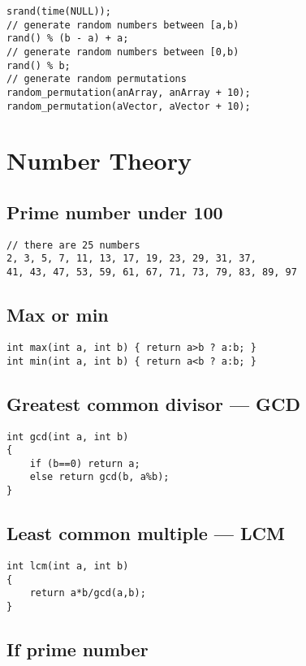 \documentclass[a4paper]{article}
\begin{document}
\begin{verbatim}
srand(time(NULL));
// generate random numbers between [a,b)
rand() % (b - a) + a;
// generate random numbers between [0,b)
rand() % b; 
// generate random permutations
random_permutation(anArray, anArray + 10);
random_permutation(aVector, aVector + 10);
\end{verbatim}
	
\section{Number Theory}

\subsection{Prime number under 100}
\begin{verbatim}
// there are 25 numbers
2, 3, 5, 7, 11, 13, 17, 19, 23, 29, 31, 37,
41, 43, 47, 53, 59, 61, 67, 71, 73, 79, 83, 89, 97
\end{verbatim}

\subsection{Max or min}
\begin{verbatim}
int max(int a, int b) { return a>b ? a:b; }
int min(int a, int b) { return a<b ? a:b; }
\end{verbatim}

\subsection{Greatest common divisor --- GCD}

\begin{verbatim}
int gcd(int a, int b)
{
	if (b==0) return a;
	else return gcd(b, a%b);
}
\end{verbatim}

\subsection{Least common multiple --- LCM}

\begin{verbatim}
int lcm(int a, int b)
{
	return a*b/gcd(a,b);
}
\end{verbatim}

\subsection{If prime number}
\end{document}
